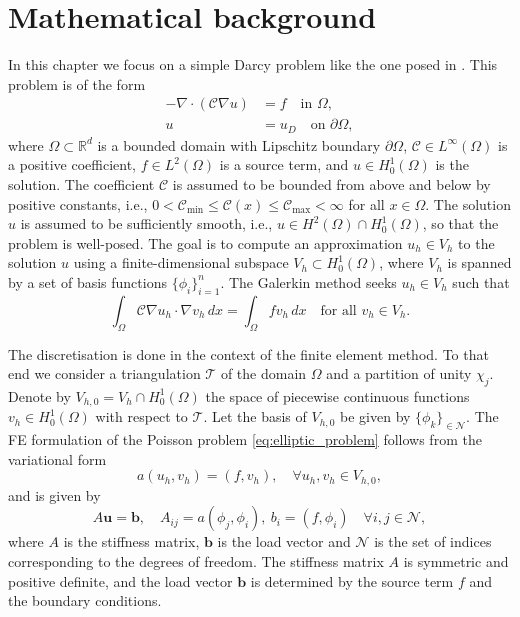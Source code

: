 \chapter{Mathematical background}\label{ch:background}\newpage
In this chapter we focus on a simple Darcy problem like the one posed in \cite{acms_coarse_space_Heinlein2018,ams_coarse_space_comp_study_Alves2024}. This problem is of the form
\begin{equation}
  \label{eq:elliptic_problem}
  \begin{aligned}
    -\nabla\cdot\left(\mathcal{C}\nabla u\right) & = f \quad \text{in } \Omega,           \\
    u                                       & = u_D \quad \text{on } \partial\Omega,
  \end{aligned}
\end{equation}
where $\Omega\subset\mathbb{R}^d$ is a bounded domain with Lipschitz boundary $\partial\Omega$, $\mathcal{C}\in L^\infty(\Omega)$ is a positive coefficient, $f\in L^2(\Omega)$ is a source term, and $u\in H^1_0(\Omega)$ is the solution. The coefficient $\mathcal{C}$ is assumed to be bounded from above and below by positive constants, i.e., $0 < \mathcal{C}_{\min} \leq \mathcal{C}(x) \leq \mathcal{C}_{\max} < \infty$ for all $x\in\Omega$. The solution $u$ is assumed to be sufficiently smooth, i.e., $u\in H^2(\Omega)\cap H^1_0(\Omega)$, so that the problem is well-posed. The goal is to compute an approximation $u_h\in V_h$ to the solution $u$ using a finite-dimensional subspace $V_h\subset H^1_0(\Omega)$, where $V_h$ is spanned by a set of basis functions $\{\phi_i\}_{i=1}^n$. The Galerkin method seeks $u_h\in V_h$ such that
\begin{equation}
  \label{eq:galerkin}
  \int_\Omega \mathcal{C}\nabla u_h\cdot\nabla v_h\,dx = \int_\Omega f v_h\,dx \quad \text{for all } v_h\in V_h.
\end{equation}

The discretisation is done in the context of the finite element method. To that end we consider a triangulation $\mathcal{T}$ of the domain $\Omega$ and a partition of unity $\chi_j$. Denote by $V_{h,0} = V_h \cap H^1_0(\Omega)$ the space of piecewise continuous functions $v_h\in H^1_0(\Omega)$ with respect to $\mathcal{T}$. Let the basis of $V_{h,0}$ be given by $\{\phi_k\}_{\in\mathcal{N}}$. The FE formulation of the Poisson problem \cref{eq:elliptic_problem} follows from the variational form
\[
    a(u_h, v_h) = (f, v_h), \quad \forall u_h, v_h \in V_{h,0},
\]
and is given by
\begin{equation}
    A\mathbf{u} = \mathbf{b}, \quad A_{ij} = a(\phi_j, \phi_i), \ b_i = (f, \phi_i) \quad \forall i,j\in\mathcal{N},
\end{equation}
where $A$ is the stiffness matrix, $\mathbf{b}$ is the load vector and $\mathcal{N}$ is the set of indices corresponding to the degrees of freedom. The stiffness matrix $A$ is symmetric and positive definite, and the load vector $\mathbf{b}$ is determined by the source term $f$ and the boundary conditions.

